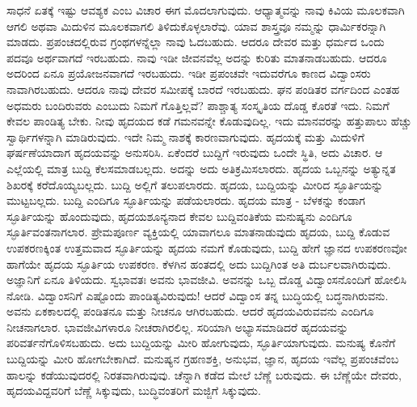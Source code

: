 ಸಾಧನೆ ಏತಕ್ಕೆ ಇಷ್ಟು ಆವಶ್ಯಕ ಎಂಬ ವಿಚಾರ ಈಗ ಮೊದಲಾಗುವುದು. ಆಧ್ಯಾತ್ಮವನ್ನು ನಾವು ಕಿವಿಯ ಮೂಲಕವಾಗಿ ಆಗಲಿ ಅಥವಾ ಮಿದುಳಿನ ಮೂಲಕವಾಗಲಿ ತಿಳಿದುಕೊಳ್ಳಲಾರೆವು. ಯಾವ ಶಾಸ್ತ್ರವೂ ನಮ್ಮನ್ನು ಧಾರ್ಮಿಕರನ್ನಾಗಿ ಮಾಡದು. ಪ್ರಪಂಚದಲ್ಲಿರುವ ಗ್ರಂಥಗಳನ್ನೆಲ್ಲಾ ನಾವು ಓದಬಹುದು. ಆದರೂ ದೇವರ ಮತ್ತು ಧರ್ಮದ ಒಂದು ಪದವೂ ಅರ್ಥವಾಗದೆ ಇರಬಹುದು. ನಾವು ಇಡೀ ಜೀವನವೆಲ್ಲ ಅದನ್ನು ಕುರಿತು ಮಾತನಾಡಬಹುದು. ಆದರೂ ಅದರಿಂದ ಏನೂ ಪ್ರಯೋಜನವಾಗದೆ ಇರಬಹುದು. ಇಡೀ ಪ್ರಪಂಚವೇ ಇದುವರೆಗೂ ಕಾಣದ ವಿದ್ವಾಂಸರು ನಾವಾಗಿರಬಹುದು. ಆದರೂ ನಾವು ದೇವರ ಸಮೀಪಕ್ಕೆ ಬಾರದೆ ಇರಬಹುದು. ಘನ ಪಂಡಿತರ ವರ್ಗದಿಂದ ಎಂತಹ ಅಧಮರು ಬಂದಿರುವರು ಎಂಬುದು ನಿಮಗೆ ಗೊತ್ತಿಲ್ಲವೆ? ಪಾಶ್ಚಾತ್ಯ ಸಂಸ್ಕೃತಿಯ ದೊಡ್ಡ ಕೊರತೆ ಇದು. ನಿಮಗೆ ಕೇವಲ ಪಾಂಡಿತ್ಯ ಬೇಕು. ನೀವು ಹೃದಯದ ಕಡೆ ಗಮನವನ್ನೇ ಕೊಡುವುದಿಲ್ಲ. ಇದು ಮಾನವರನ್ನು ಹತ್ತುಪಾಲು ಹೆಚ್ಚು ಸ್ವಾರ್ಥಿಗಳನ್ನಾಗಿ ಮಾಡಿರುವುದು. ಇದೇ ನಿಮ್ಮ ನಾಶಕ್ಕೆ ಕಾರಣವಾಗುವುದು. ಹೃದಯಕ್ಕೆ ಮತ್ತು ಮಿದುಳಿಗೆ ಘರ್ಷಣೆಯಾದಾಗ ಹೃದಯವನ್ನು ಅನುಸರಿಸಿ. ಏಕೆಂದರೆ ಬುದ್ದಿಗೆ ಇರುವುದು ಒಂದೇ ಸ್ಥಿತಿ, ಅದು ವಿಚಾರ. ಆ ಎಲ್ಲೆಯಲ್ಲಿ ಮಾತ್ರ ಬುದ್ದಿ ಕೆಲಸಮಾಡಬಲ್ಲದು. ಅದನ್ನು ಅದು ಅತಿಕ್ರಮಿಸಲಾರದು. ಹೃದಯ ಒಬ್ಬನನ್ನು ಅತ್ಯುನ್ನತ ಶಿಖರಕ್ಕೆ ಕರೆದೊಯ್ಯಬಲ್ಲದು. ಬುದ್ದಿ ಅಲ್ಲಿಗೆ ತಲುಪಲಾರದು. ಹೃದಯ, ಬುದ್ದಿಯನ್ನು ಮೀರಿದ ಸ್ಫೂರ್ತಿಯನ್ನು ಮುಟ್ಟಬಲ್ಲದು. ಬುದ್ದಿ ಎಂದಿಗೂ ಸ್ಫೂರ್ತಿಯನ್ನು ಪಡೆಯಲಾರದು. ಹೃದಯ ಮಾತ್ರ - ಬೆಳಕನ್ನು ಕಂಡಾಗ ಸ್ಫೂರ್ತಿಯನ್ನು ಹೊಂದುವುದು, ಹೃದಯಶೂನ್ಯನಾದ ಕೇವಲ ಬುದ್ದಿವಂತಿಕೆಯ ಮನುಷ್ಯನು ಎಂದಿಗೂ ಸ್ಫೂರ್ತಿವಂತನಾಗಲಾರ. ಪ್ರೇಮಪೂರ್ಣ ವ್ಯಕ್ತಿಯಲ್ಲಿ ಯಾವಾಗಲೂ ಮಾತನಾಡುವುದು ಹೃದಯ, ಬುದ್ದಿ ಕೊಡುವ ಉಪಕರಣಕ್ಕಿಂತ ಉತ್ತಮವಾದ ಸ್ಫೂರ್ತಿಯನ್ನು ಹೃದಯ ನಮಗೆ ಕೊಡುವುದು, ಬುದ್ದಿ ಹೇಗೆ ಜ್ಞಾನದ ಉಪಕರಣವೋ ಹಾಗೆಯೇ ಹೃದಯ ಸ್ಫೂರ್ತಿಯ ಉಪಕರಣ. ಕೆಳಗಿನ ಹಂತದಲ್ಲಿ ಅದು ಬುದ್ದಿಗಿಂತ ಅತಿ ದುರ್ಬಲವಾಗಿರುವುದು. ಅಜ್ಞಾನಿಗೆ ಏನೂ ತಿಳಿಯದು. ಸ್ವಭಾವತಃ ಅವನು ಭಾವಜೀವಿ. ಅವನನ್ನು ಒಬ್ಬ ದೊಡ್ಡ ವಿದ್ವಾಂಸನೊಂದಿಗೆ ಹೋಲಿಸಿ ನೋಡಿ. ವಿದ್ವಾಂಸನಿಗೆ ಎಷ್ಟೊಂದು ಪಾಂಡಿತ್ಯವಿರುವುದು! ಆದರೆ ವಿದ್ವಾಂಸ ತನ್ನ ಬುದ್ಧಿಯಲ್ಲಿ ಬದ್ಧನಾಗಿರುವನು. ಅವನು ಏಕಕಾಲದಲ್ಲಿ ಪಂಡಿತನೂ ಮತ್ತು ನೀಚನೂ ಆಗಿರಬಹುದು. ಆದರೆ ಹೃದಯವಿರುವವನು ಎಂದಿಗೂ ನೀಚನಾಗಲಾರ. ಭಾವಜೀವಿಗಳಾರೂ ನೀಚರಾಗಿರಲಿಲ್ಲ. ಸರಿಯಾಗಿ ಅಭ್ಯಾಸಮಾಡಿದರೆ ಹೃದಯವನ್ನು ಪರಿವರ್ತನೆಗೊಳಿಸಬಹುದು. ಅದು ಬುದ್ದಿಯನ್ನು ಮೀರಿ ಹೋಗುವುದು, ಸ್ಫೂರ್ತಿಯಾಗುವುದು. ಮನುಷ್ಯ ಕೊನೆಗೆ ಬುದ್ದಿಯನ್ನು ಮೀರಿ ಹೋಗಬೇಕಾಗಿದೆ. ಮನುಷ್ಯನ ಗ್ರಹಣಶಕ್ತಿ, ಅನುಭವ, ಜ್ಞಾನ, ಹೃದಯ ಇವೆಲ್ಲ ಪ್ರಪಂಚವೆಂಬ ಹಾಲನ್ನು ಕಡೆಯುವುದರಲ್ಲಿ ನಿರತವಾಗಿರುವುವು. ಚೆನ್ನಾಗಿ ಕಡೆದ ಮೇಲೆ ಬೆಣ್ಣೆ ಬರುವುದು. ಈ ಬೆಣ್ಣೆಯೇ ದೇವರು, ಹೃದಯವಿದ್ದವರಿಗೆ ಬೆಣ್ಣೆ ಸಿಕ್ಕುವುದು, ಬುದ್ಧಿವಂತರಿಗೆ ಮಜ್ಜಿಗೆ ಸಿಕ್ಕುವುದು.

